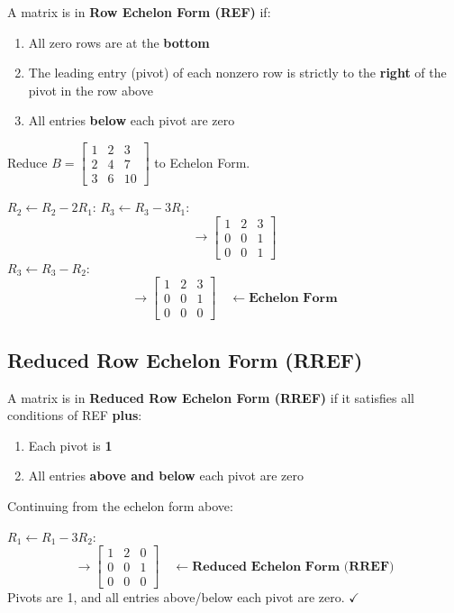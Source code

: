 \documentclass[12pt]{article}
\newcommand{\mat}[1]{\begin{bmatrix}#1\end{bmatrix}}
\begin{document}
\begin{defbox}
A matrix is in \textbf{Row Echelon Form (REF)} if:
\begin{enumerate}[leftmargin=20pt, itemsep=2pt]
  \item All zero rows are at the \textbf{bottom}
  \item The leading entry (pivot) of each nonzero row is strictly to the \textbf{right} of the pivot in the row above
  \item All entries \textbf{below} each pivot are zero
\end{enumerate}
\end{defbox}

\begin{solbox}
Reduce $B = \mat{1&2&3\\2&4&7\\3&6&10}$ to Echelon Form.

$R_2 \leftarrow R_2 - 2R_1$: \quad $R_3 \leftarrow R_3 - 3R_1$:
\[
  \to \mat{1&2&3\\0&0&1\\0&0&1}
\]
$R_3 \leftarrow R_3 - R_2$:
\[
  \to \mat{1&2&3\\0&0&1\\0&0&0} \quad \leftarrow \textbf{Echelon Form}
\]
\end{solbox}

\subsection{Reduced Row Echelon Form (RREF)}

\begin{defbox}
A matrix is in \textbf{Reduced Row Echelon Form (RREF)} if it satisfies all conditions of REF \textbf{plus}:
\begin{enumerate}[leftmargin=20pt, itemsep=2pt]
  \item Each pivot is \textbf{1}
  \item All entries \textbf{above and below} each pivot are zero
\end{enumerate}
\end{defbox}

\begin{solbox}
Continuing from the echelon form above:

$R_1 \leftarrow R_1 - 3R_2$:
\[
  \to \mat{1&2&0\\0&0&1\\0&0&0} \quad \leftarrow \textbf{Reduced Echelon Form (RREF)}
\]
Pivots are 1, and all entries above/below each pivot are zero. $\checkmark$
\end{solbox}
\end{document}
